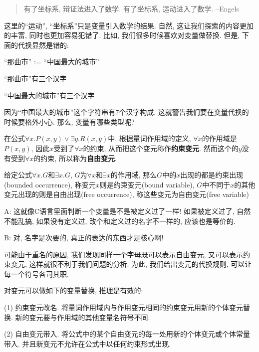 \begin{quote}
有了坐标系, 辩证法进入了数学. 有了坐标系, 运动进入了数学. 
\hfill --Engels
\end{quote}

这里的``运动'', ``坐标系''只是变量引入数学的结果. 自然, 这让我们探索的内容更加的丰富, 同时也更加容易犯错了. 比如, 我们很多时候喜欢对变量做替换. 但是, 下面的代换显然是错的: 

\begin{example}
	``那曲市'' := ``中国最大的城市''
	
	``那曲市''有三个汉字
	
	``中国最大的城市''有三个汉字
\end{example}

因为``中国最大的城市''这个字符串有7个汉字构成. 这就警告我们要在变量代换的时候要格外小心. 那么, 变量有哪些类型呢? 

在公式$\forall x. P(x,y)\lor \exists y. R(x,y)$中, 根据量词作用域的定义, $\forall x$的作用域是$P(x,y)$, 因此$x$受到了$\forall x$的约束, 从而把这个变元称作{\bf 约束变元}. 然而这个的$y$没有受到$\forall x$的约束, 所以称为{\bf 自由变元}. 

\begin{definition}[约束变元与自由变元]
	给定公式$\forall x. G$和$\exists x.G$, $G$为$\forall x$和$\exists x$的作用域, 那么$G$中的$x$出现的都是约束出现(bounded occurrence), 称变元$x$则是约束变元(bound variable), $G$中不同于$x$的其他变元出现的则是自由出现(free occurrence), 称这些变元为自由变元(free variable)
\end{definition}

\begin{dialogue}
	A: 这就像C语言里面判断一个变量是不是被定义过了一样! 如果被定义过了, 自然不能乱搞, 如果没有定义过, 改个和定义过的名字不一样的, 应该也是等价的. 
	
	B: 对, 名字是次要的, 真正的表达的东西才是核心啊! 
\end{dialogue}

可能由于重名的原因, 我们发现同样一个字母既可以表示自由变元, 又可以表示约束变元, 这样就很不利于我们问题的分析. 为此, 我们给出变元的代换规则, 可以让每一个符号各司其职. 

\begin{theorem}[变元的代换规则]

对变元可以做如下的变量替换, 推理是有效的: 

(1) 约束变元改名. 将量词作用域内与作用变元相同的约束变元用新的个体变元替换. 新的变元要与作用域的其他变量名符号不同. 

(2) 自由变元带入. 将公式中的某个自由变元的每一处用新的个体变元或个体常量带入. 并且新变元不允许在公式中以任何约束形式出现. 
	
\end{theorem}

